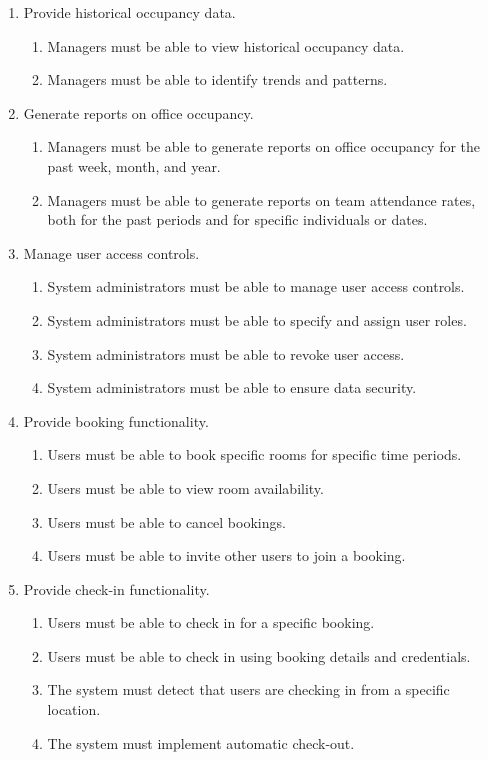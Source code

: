 \documentclass[11pt,a4paper]{article}
\begin{document}
\begin{enumerate}[label=\arabic*.]
    \item Provide historical occupancy data.
    \begin{enumerate}
        \item Managers must be able to view historical occupancy data.
        \item Managers must be able to identify trends and patterns.
    \end{enumerate}
    
    \item Generate reports on office occupancy.
    \begin{enumerate}
        \item Managers must be able to generate reports on office occupancy for the past week, month, and year.
        \item Managers must be able to generate reports on team attendance rates, both for the past periods and for specific individuals or dates.
    \end{enumerate}
    
    \item Manage user access controls.
    \begin{enumerate}
        \item System administrators must be able to manage user access controls.
        \item System administrators must be able to specify and assign user roles.
        \item System administrators must be able to revoke user access.
        \item System administrators must be able to ensure data security.
    \end{enumerate}
    
    \item Provide booking functionality.
    \begin{enumerate}
        \item Users must be able to book specific rooms for specific time periods.
        \item Users must be able to view room availability.
        \item Users must be able to cancel bookings.
        \item Users must be able to invite other users to join a booking.
    \end{enumerate}
    
    \item Provide check-in functionality.
    \begin{enumerate}
        \item Users must be able to check in for a specific booking.
        \item Users must be able to check in using booking details and credentials.
        \item The system must detect that users are checking in from a specific location.
        \item The system must implement automatic check-out.
    \end{enumerate}


\end{enumerate}
\end{document}
